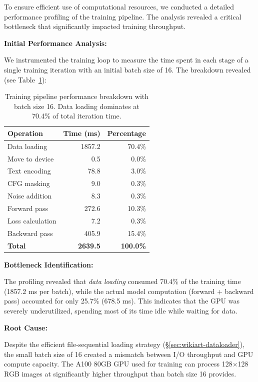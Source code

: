 To ensure efficient use of computational resources, we conducted a detailed performance profiling of the training pipeline. The analysis revealed a critical bottleneck that significantly impacted training throughput.

\textbf{Initial Performance Analysis:}

We instrumented the training loop to measure the time spent in each stage of a single training iteration with an initial batch size of 16. The breakdown revealed (see Table~\ref{tab:wikiart-bottleneck}):

\begin{table}[htbp]
\centering
\begin{tabular}{lrr}
\toprule
\textbf{Operation} & \textbf{Time (ms)} & \textbf{Percentage} \\
\midrule
Data loading & 1857.2 & 70.4\% \\
Move to device & 0.5 & 0.0\% \\
Text encoding & 78.8 & 3.0\% \\
CFG masking & 9.0 & 0.3\% \\
Noise addition & 8.3 & 0.3\% \\
Forward pass & 272.6 & 10.3\% \\
Loss calculation & 7.2 & 0.3\% \\
Backward pass & 405.9 & 15.4\% \\
\midrule
\textbf{Total} & \textbf{2639.5} & \textbf{100.0\%} \\
\bottomrule
\end{tabular}
\caption{Training pipeline performance breakdown with batch size 16. Data loading dominates at 70.4\% of total iteration time.}
\label{tab:wikiart-bottleneck}
\end{table}

\textbf{Bottleneck Identification:}

The profiling revealed that \emph{data loading} consumed 70.4\% of the training time (1857.2 ms per batch), while the actual model computation (forward + backward pass) accounted for only 25.7\% (678.5 ms). This indicates that the GPU was severely underutilized, spending most of its time idle while waiting for data.

\textbf{Root Cause:}

Despite the efficient file-sequential loading strategy (\S\ref{sec:wikiart-dataloader}), the small batch size of 16 created a mismatch between I/O throughput and GPU compute capacity. The A100 80GB GPU used for training can process 128$\times$128 RGB images at significantly higher throughput than batch size 16 provides.

